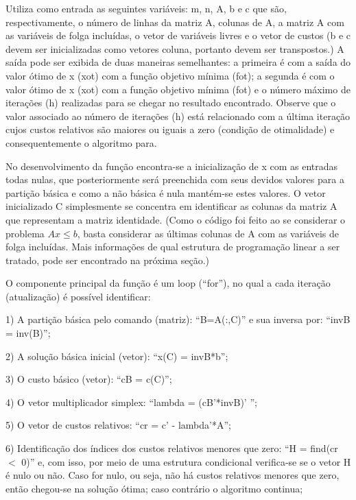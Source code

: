 \documentclass[10pt]{article}
\begin{document}
Utiliza como entrada as seguintes variáveis: m, n, A, b e c que são, respectivamente, o número de linhas da matriz A, colunas de A, a matriz A com as variáveis de folga incluídas, o vetor de variáveis livres e o vetor de custos (b e c devem ser inicializadas como vetores coluna, portanto devem ser transpostos.) A saída pode ser exibida de duas maneiras semelhantes: a primeira é com a saída do valor ótimo de x (xot) com a função objetivo mínima (fot); a segunda é com o valor ótimo de x (xot) com a função objetivo mínima (fot) e o número máximo de iterações (h) realizadas para se chegar no resultado encontrado. Observe que o valor associado ao número de iterações (h) está relacionado com a última iteração cujos custos relativos são maiores ou iguais a zero (condição de otimalidade) e consequentemente o algoritmo para.
\newline

No desenvolvimento da função encontra-se a inicialização de x com as entradas todas nulas, que posteriormente será preenchida com seus devidos valores para a partição básica e como a não básica é nula mantém-se estes valores. O vetor inicializado C simplesmente se concentra em identificar as colunas da matriz A que representam a matriz identidade. (Como o código foi feito ao se considerar o problema $Ax \le b$, basta considerar as últimas colunas de A com as variáveis de folga incluídas. Mais informações de qual estrutura de programação linear a ser tratado, pode ser encontrado na próxima seção.)
\newline

O componente principal da função é um loop (``for''), no qual a cada iteração (atualização) é possível identificar:
\newline

1) A partição básica pelo comando (matriz): ``B=A(:,C)'' e sua inversa por: ``invB = inv(B)'';
\newline

2) A solução básica inicial (vetor): ``x(C) = invB*b'';
\newline

3) O custo básico (vetor): ``cB = c(C)'';
\newline

4) O vetor multiplicador simplex: ``lambda = (cB'*invB)' '';
\newline

5) O vetor de custos relativos: ``cr = c' - lambda'*A'';
\newline

6) Identificação dos índices dos custos relativos menores que zero: ``H = find(cr $<$ 0)'' e, com isso, por meio de uma estrutura condicional verifica-se se o vetor H é nulo ou não. Caso for nulo, ou seja, não há custos relativos menores que zero, então chegou-se na solução ótima; caso contrário o algoritmo continua;
\newline
\end{document}

